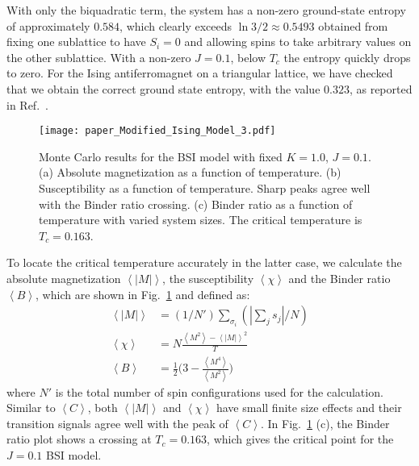 \documentclass[pra,letterpaper,10pt,twocolumn]{revtex4}
\begin{document}
With only the biquadratic term, the system has a non-zero ground-state
entropy of approximately $0.584$, which clearly exceeds $\ln{3}/2\approx
0.5493$ obtained from fixing one sublattice to have $S_i=0$ and allowing
spins to take arbitrary values on the other sublattice.  With a non-zero
$J=0.1$, below $T_c$ the entropy quickly drops to zero. For the Ising
antiferromagnet on a triangular lattice, we have checked that we obtain
the correct ground state entropy\cite{Wannier, Stephenson1,
Stephenson2}, with the value $0.323$, as reported in
Ref.~.

\begin{figure}[!h]
\texttt{[image: paper\_Modified\_Ising\_Model\_3.pdf]}  
\caption{
Monte Carlo results for the BSI model with fixed $K=1.0$, $J=0.1$. (a)
Absolute magnetization as a function of temperature. (b) Susceptibility
as a function of temperature. Sharp peaks agree well with the Binder
ratio crossing. (c) Binder ratio as a function of temperature with
varied system sizes. The critical temperature is $T_c=0.163$. 
\label{fig:Modified_Ising_Model_3}
}
\end{figure}

To locate the critical temperature accurately in the latter case, we
calculate the absolute magnetization $\left\langle |M| \right\rangle$,
the susceptibility $\left\langle \chi \right\rangle$ and the Binder
ratio\cite{Binder} $\left\langle B \right\rangle$, which are shown in
Fig.~\ref{fig:Modified_Ising_Model_3} and defined as:
\begin{align}
\left\langle |M| \right\rangle &= (1/N')\sum_{\sigma_i}(|\sum_j s_j|/N) 
\nonumber \\
\left\langle \chi \right\rangle &= 
N\frac{\left\langle M^2 \right\rangle - \left\langle |M| \right\rangle^2}{T}
\nonumber \\
\left\langle B \right\rangle &= 
\frac{1}{2}\Big(3-\frac{\left\langle M^4 \right\rangle}
{\left\langle M^2 \right\rangle}\Big)
\label{eq:BSI_eq_M_chi_B}
\end{align}
where $N'$ is the total number of spin configurations used for the
calculation. Similar to $\left\langle C \right\rangle$, both
$\left\langle |M| \right\rangle$ and $\left\langle \chi \right\rangle$
have small finite size effects and their transition signals agree
well with the peak of $\left\langle C \right\rangle$. In
Fig.~\ref{fig:Modified_Ising_Model_3} (c), the Binder ratio plot shows a crossing at $T_c=0.163$, which gives the critical point for the $J=0.1$ BSI model.
\end{document}

